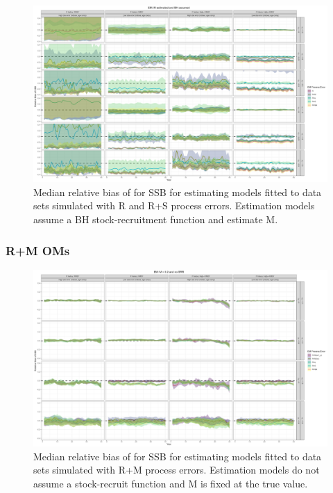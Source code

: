 \documentclass[
  12pt,
]{article}
\begin{document}
\begin{landscape}
\begin{figure}
\caption{Median relative bias of for SSB for estimating models fitted to data sets simulated with R and R+S process errors. Estimation models assume a BH stock-recruitment function and estimate M.}\label{naa_om_em_BH_ME_relbias_ssb}
\begin{center}
\includegraphics[width = \textwidth]{naa_om_BH_ME_relbias_ssb.png}
\end{center}
\end{figure}
\end{landscape}

\hypertarget{rm-oms}{%
\subsubsection*{R+M OMs}\label{rm-oms}}

\begin{landscape}
\begin{figure}
\caption{Median relative bias of for SSB for estimating models fitted to data sets simulated with R+M process errors.  Estimation models do not assume a stock-recruit function and M is fixed at the true value.}\label{M_om_em_R_MF_relbias_ssb}
\begin{center}
\includegraphics[width = \textwidth]{M_om_R_MF_relbias_ssb.png}
\end{center}
\end{figure}
\end{landscape}
\end{document}
